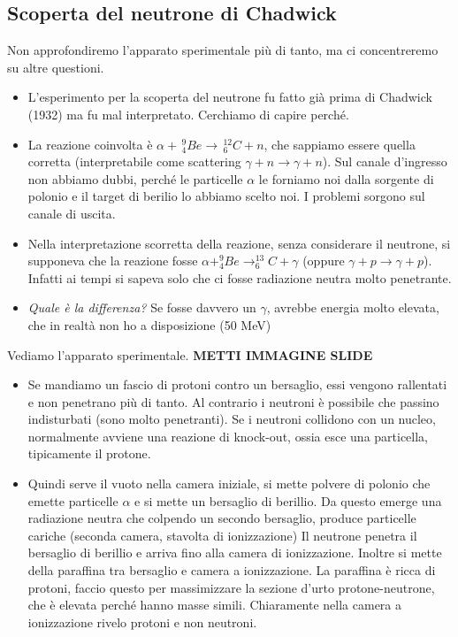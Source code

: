 \subsection{Scoperta del neutrone di Chadwick}
Non approfondiremo l'apparato sperimentale più di tanto, ma ci concentreremo su altre questioni.
\begin{itemize}
    \item L'esperimento per la scoperta del neutrone fu fatto già prima di Chadwick (1932) ma fu mal interpretato. Cerchiamo di capire perché.
    \item La reazione coinvolta è $ \alpha + \,^9_4Be \rightarrow\, ^{12}_6C + n$, che sappiamo essere quella corretta (interpretabile come scattering $\gamma + n \rightarrow \gamma + n$). Sul canale d'ingresso non abbiamo dubbi, perché le particelle $\alpha$ le forniamo noi dalla sorgente di polonio e il target di berilio lo abbiamo scelto noi. I problemi sorgono sul canale di uscita. 
    \item Nella interpretazione scorretta della reazione, senza considerare il neutrone, si supponeva che la reazione fosse $ \alpha + ^9_4Be \rightarrow ^{13}_6C + \gamma$ (oppure $\gamma + p \rightarrow \gamma + p$). Infatti ai tempi si sapeva solo che ci fosse radiazione neutra molto penetrante. 
    \item \textit{Quale è la differenza?} Se fosse davvero un $\gamma$, avrebbe energia molto elevata, che in realtà non ho a disposizione (50 MeV)
\end{itemize}
Vediamo l'apparato sperimentale. \textbf{METTI IMMAGINE SLIDE}
\begin{itemize}
    \item Se mandiamo un fascio di protoni contro un bersaglio, essi vengono rallentati e non penetrano più di tanto. Al contrario i neutroni è possibile che passino indisturbati (sono molto penetranti). Se i neutroni collidono con un nucleo, normalmente avviene una reazione di knock-out, ossia esce una particella, tipicamente il protone.
    \item Quindi serve il vuoto nella camera iniziale, si mette polvere di polonio che emette particelle $\alpha$ e si mette un bersaglio di berillio. Da questo emerge una radiazione neutra che colpendo un secondo bersaglio, produce particelle cariche (seconda camera, stavolta di ionizzazione) Il neutrone penetra il bersaglio di berillio e arriva fino alla camera di ionizzazione. Inoltre si mette della paraffina tra bersaglio e camera a ionizzazione. La paraffina è ricca di protoni, faccio questo per massimizzare la sezione d'urto protone-neutrone, che è elevata perché hanno masse simili. Chiaramente nella camera a ionizzazione rivelo protoni e non neutroni.
\end{itemize}
